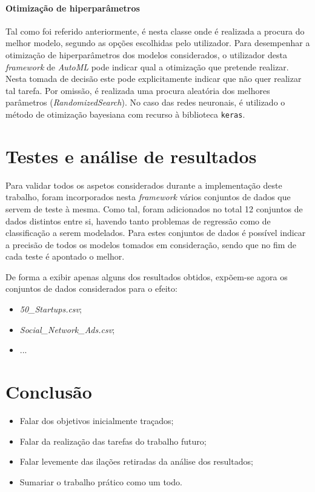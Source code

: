 \documentclass[a4paper]{report}
\begin{document}
{			\subsubsection{Otimização de hiperparâmetros} \label{sssec:Optimization}
			Tal como foi referido anteriormente, é nesta classe onde é realizada a procura do melhor modelo, segundo as opções escolhidas pelo utilizador.
			Para desempenhar a otimização de hiperparâmetros dos modelos considerados, o utilizador desta \textit{framework} de \textit{AutoML} pode indicar qual a otimização que pretende realizar.
			Nesta tomada de decisão este pode explicitamente indicar que não quer realizar tal tarefa. Por omissão, é realizada uma procura aleatória dos melhores parâmetros (\textit{RandomizedSearch}).
			No caso das redes neuronais, é utilizado o método de otimização bayesiana com recurso à biblioteca \texttt{keras}.
}

\chapter{Testes e análise de resultados} \label{ch:Test&Analysis}
\large{
	Para validar todos os aspetos considerados durante a implementação deste trabalho, foram incorporados nesta \textit{framework} vários conjuntos de dados que servem de teste à mesma.
	Como tal, foram adicionados no total 12 conjuntos de dados distintos entre si, havendo tanto problemas de regressão como de classificação a serem modelados.
	Para estes conjuntos de dados é possível indicar a precisão de todos os modelos tomados em consideração, sendo que no fim de cada teste é apontado o melhor.

	De forma a exibir apenas alguns dos resultados obtidos, expõem-se agora os conjuntos de dados considerados para o efeito:
	\begin{itemize}
		\item \textsl{50\_Startups.csv};
		\item \textsl{Social\_Network\_Ads.csv};
		\item ...
	\end{itemize}
}

\chapter{Conclusão} \label{ch:Conclusion}
\large{
	\begin{itemize}
		\item Falar dos objetivos inicialmente traçados;
		\item Falar da realização das tarefas do trabalho futuro;
		\item Falar levemente das ilações retiradas da análise dos resultados;
		\item Sumariar o trabalho prático como um todo.
	\end{itemize}
}
\end{document}
